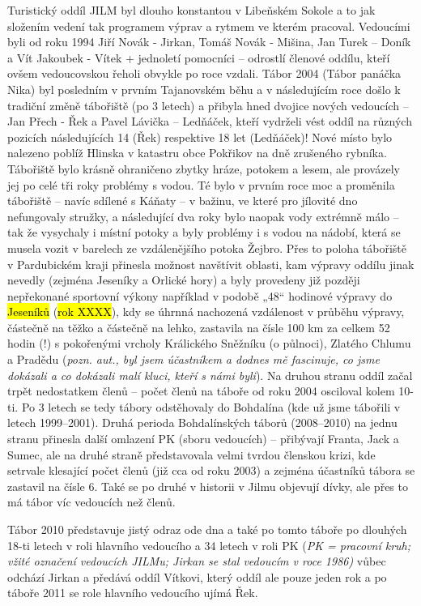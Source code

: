 Turistický oddíl JILM byl dlouho konstantou v Libeňském Sokole a to jak
složením vedení tak programem výprav a rytmem ve kterém pracoval.
Vedoucími byli od roku 1994 Jiří Novák - Jirkan, Tomáš Novák - Mišina,
Jan Turek -- Doník a Vít Jakoubek - Vítek + jednoletí pomocníci --
odrostlí členové oddílu, kteří ovšem vedoucovskou řeholi obvykle po roce
vzdali. Tábor 2004 (Tábor panáčka Nika) byl posledním v prvním
Tajanovském běhu a v následujícím roce došlo k tradiční změně tábořiště
(po 3 letech) a přibyla hned dvojice nových vedoucích -- Jan Přech - Řek
a Pavel Lávička -- Ledňáček, kteří vydrželi vést oddíl na různých
pozicích následujících 14 (Řek) respektive 18 let (Ledňáček)! Nové místo
bylo nalezeno poblíž Hlinska v katastru obce Pokřikov na dně zrušeného
rybníka. Tábořiště bylo krásně ohraničeno zbytky hráze, potokem a lesem,
ale provázely jej po celé tři roky problémy s vodou. Té bylo v prvním
roce moc a proměnila tábořiště -- navíc sdílené s Káňaty -- v bažinu, ve
které pro jílovité dno nefungovaly stružky, a následující dva roky bylo
naopak vody extrémně málo -- tak že vysychaly i místní potoky a byly
problémy i s vodou na nádobí, která se musela vozit v barelech ze
vzdálenějšího potoka Žejbro. Přes to poloha tábořiště v Pardubickém
kraji přinesla možnost navštívit oblasti, kam výpravy oddílu jinak
nevedly (zejména Jeseníky a Orlické hory) a byly provedeny již později
nepřekonané sportovní výkony například v podobě „48`` hodinové výpravy
do \hl{Jeseníků} (\hl{rok XXXX}), kdy se úhrnná nachozená vzdálenost v
průběhu výpravy, částečně na těžko a částečně na lehko, zastavila na
čísle 100 km za celkem 52 hodin (!) s pokořenými vrcholy Králického
Sněžníku (o půlnoci), Zlatého Chlumu a Pradědu (\emph{pozn. aut., byl
jsem účastníkem a dodnes mě fascinuje, co jsme dokázali a co dokázali
malí kluci, kteří s námi byli}). Na druhou stranu oddíl začal trpět
nedostatkem členů -- počet členů na táboře od roku 2004 osciloval kolem
10-ti. Po 3 letech se tedy tábory odstěhovaly do Bohdalína (kde už jsme
tábořili v letech 1999--2001). Druhá perioda Bohdalínských táborů
(2008--2010) na jednu stranu přinesla další omlazení PK (sboru
vedoucích) -- přibývají Franta, Jack a Sumec, ale na druhé straně
představovala velmi tvrdou členskou krizi, kde setrvale klesající počet
členů (již cca od roku 2003) a zejména účastníků tábora se zastavil na
čísle 6. Také se po druhé v historii v Jilmu objevují dívky, ale přes to
má tábor víc vedoucích než členů.

Tábor 2010 představuje jistý odraz ode dna a také po tomto táboře po
dlouhých 18-ti letech v roli hlavního vedoucího a 34 letech v roli PK
(\emph{PK = pracovní kruh; vžité označení vedoucích JILMu; Jirkan se
stal vedoucím v roce 1986)} vůbec odchází Jirkan a předává oddíl
Vítkovi, který oddíl ale pouze jeden rok a po táboře 2011 se role
hlavního vedoucího ujímá Řek.


